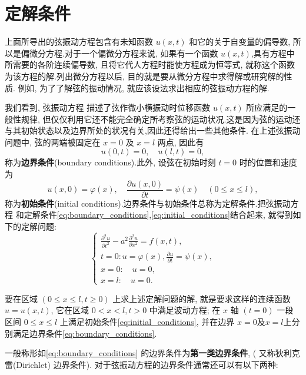 \section{定解条件}

上面所导出的弦振动方程包含有未知函数 $u(x, t)$ 和它的关于自变量的偏导数, 
所以是偏微分方程.对于一个偏微分方程来说, 如果有一个函数 $u(x, t)$,具有方程中所需要的各阶连续偏导数, 
且将它代人方程时能使方程成为恒等式, 就称这个函数为该方程的解.列出微分方程以后, 目的就是要从微分方程中求得解或研究解的性质.
例如, 为了了解弦的振动情况, 就应该设法求出相应的弦振动方程的解.

我们看到, 弦振动方程 描述了弦作微小横振动时位移函数 $u(x, t)$ 所应满足的一般性规律, 
但仅仅利用它还不能完全确定所考察弦的运动状况.这是因为弦的运动还与其初始状态以及边界所处的状况有关,因此还得给出一些其他条件.
在上述弦振动问题中, 弦的两端被固定在 $x=0$ 及 $x=l$ 两点, 因此有
\begin{equation}
    u(0, t)=0, \quad u(l, t)=0,
    \label{eq:boundary_conditions}
\end{equation}
称为\textbf{边界条件}(boundary conditions).此外, 设弦在初始时刻 $t=0$ 时的位置和速度为
\begin{equation}
    u(x, 0)=\varphi(x), \quad \frac{\partial u(x, 0)}{\partial t}=\psi(x) \quad(0 \leqslant x \leqslant l),
    \label{eq:initial_conditions}
\end{equation}
称为\textbf{初始条件}(initial conditions).边界条件与初始条件总称为定解条件.把弦振动方程 
和定解条件\eqref{eq:boundary_conditions},\eqref{eq:initial_conditions}结合起来, 就得到如下的定解问题:
$$
\left\{\begin{array}{l}
	\frac{\partial^2 u}{\partial t^2}-a^2 \frac{\partial^2 u}{\partial x^2}=f(x, t), \\
	t=0: u=\varphi(x), \frac{\partial u}{\partial t}=\psi(x), \\
	x=0: \quad u=0, \\
	x=l: \quad u=0 .
\end{array}\right.
$$

要在区域 $(0 \leqslant x \leqslant l, t \geqslant 0)$ 上求上述定解问题的解, 
就是要求这样的连续函数 $u=u(x, t)$, 它在区域 $0<x<l, t>0$ 中满足波动方程; 
在 $x$ 轴 $(t=0)$ 一段区间 $0 \leqslant x \leqslant l$ 上满足初始条件\eqref{eq:initial_conditions},
 并在边界 $x=0$及$x=l$上分别满足边界条件\eqref{eq:boundary_conditions}.

一般称形如\eqref{eq:boundary_conditions} 的边界条件为\textbf{第一类边界条件}, ( 又称狄利克雷(Dirichlet) 边界条件).
对于弦振动方程的边界条件通常还可以有以下两种:

